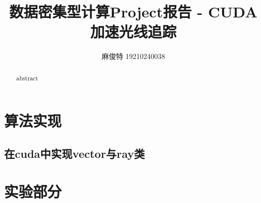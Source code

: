 \documentclass[UTF8, 12pt]{article}
\begin{document}
\title{数据密集型计算Project报告 - CUDA加速光线追踪}
\author{麻俊特 19210240038}
\maketitle

\begin{abstract}
    abstract 
\end{abstract}
\section{算法实现}
\subsection{在cuda中实现vector与ray类}
\section{实验部分}
\end{document}
